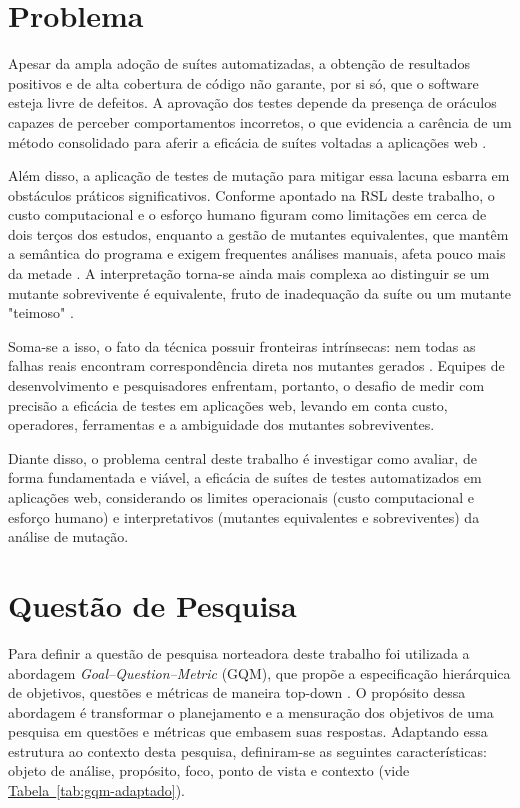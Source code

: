 \section{Problema}

Apesar da ampla adoção de suítes automatizadas, a obtenção de resultados positivos e de alta cobertura de código não garante, por si só, que o software esteja livre de defeitos. A aprovação dos testes depende da presença de oráculos capazes de perceber comportamentos incorretos, o que evidencia a carência de um método consolidado para aferir a eficácia de suítes voltadas a aplicações web \cite{yandrapally2021}. 

Além disso, a aplicação de testes de mutação para mitigar essa lacuna esbarra em obstáculos práticos significativos. Conforme apontado na RSL deste trabalho, o custo computacional e o esforço humano figuram como limitações em cerca de dois terços dos estudos, enquanto a gestão de mutantes equivalentes, que mantêm a semântica do programa e exigem frequentes análises manuais, afeta pouco mais da metade \cite{yao2014}. A interpretação torna-se ainda mais complexa ao distinguir se um mutante sobrevivente é equivalente, fruto de inadequação da suíte ou um mutante "teimoso" \cite{yao2014}.

Soma-se a isso, o fato da técnica possuir fronteiras intrínsecas: nem todas as falhas reais encontram correspondência direta nos mutantes gerados \cite{just2014}. Equipes de desenvolvimento e pesquisadores enfrentam, portanto, o desafio de medir com precisão a eficácia de testes em aplicações web, levando em conta custo, operadores, ferramentas e a ambiguidade dos mutantes sobreviventes.

Diante disso, o problema central deste trabalho é investigar como avaliar, de forma fundamentada e viável, a eficácia de suítes de testes automatizados em aplicações web, considerando os limites operacionais (custo computacional e esforço humano) e interpretativos (mutantes equivalentes e sobreviventes) da análise de mutação.

\section{Questão de Pesquisa}

Para definir a questão de pesquisa norteadora deste trabalho foi utilizada a abordagem \textit{Goal--Question--Metric} (GQM), que propõe a especificação hierárquica de objetivos, questões e métricas de maneira top-down \cite{basili1994}. O propósito dessa abordagem é transformar o planejamento e a mensuração dos objetivos de uma pesquisa em questões e métricas que embasem suas respostas. Adaptando essa estrutura ao contexto desta pesquisa, definiram-se as seguintes características: objeto de análise, propósito, foco, ponto de vista e contexto (vide \hyperref[tab:gqm-adaptado]{Tabela~\ref*{tab:gqm-adaptado}}).

